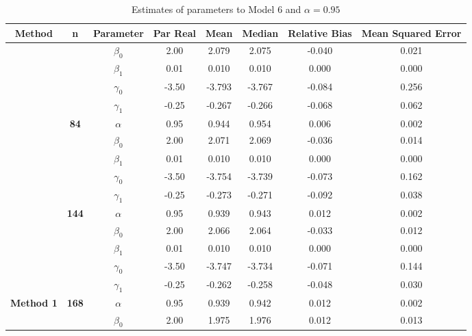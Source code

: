 \begin{table}[h]

\caption{\label{tab:Est_model_6_Alpha0.95}Estimates of parameters to Model 6 and $\alpha=0.95$}
\centering
\begin{tabular}[t]{>{}c>{}ccccccc}
\toprule
Method & n & Parameter & Par Real & Mean & Median & Relative Bias & Mean Squared Error\\
\midrule
 &  & $\beta_0$ & 2.00 & 2.079 & 2.075 & -0.040 & 0.021\\

 &  & $\beta_1$ & 0.01 & 0.010 & 0.010 & 0.000 & 0.000\\

 &  & $\gamma_0$ & -3.50 & -3.793 & -3.767 & -0.084 & 0.256\\

 &  & $\gamma_1$ & -0.25 & -0.267 & -0.266 & -0.068 & 0.062\\

 & \multirow{-5}{*}{\centering\arraybackslash \textbf{84}} & $\alpha$ & 0.95 & 0.944 & 0.954 & 0.006 & 0.002\\

 &  & $\beta_0$ & 2.00 & 2.071 & 2.069 & -0.036 & 0.014\\

 &  & $\beta_1$ & 0.01 & 0.010 & 0.010 & 0.000 & 0.000\\

 &  & $\gamma_0$ & -3.50 & -3.754 & -3.739 & -0.073 & 0.162\\

 &  & $\gamma_1$ & -0.25 & -0.273 & -0.271 & -0.092 & 0.038\\

 & \multirow{-5}{*}{\centering\arraybackslash \textbf{144}} & $\alpha$ & 0.95 & 0.939 & 0.943 & 0.012 & 0.002\\

 &  & $\beta_0$ & 2.00 & 2.066 & 2.064 & -0.033 & 0.012\\

 &  & $\beta_1$ & 0.01 & 0.010 & 0.010 & 0.000 & 0.000\\

 &  & $\gamma_0$ & -3.50 & -3.747 & -3.734 & -0.071 & 0.144\\

 &  & $\gamma_1$ & -0.25 & -0.262 & -0.258 & -0.048 & 0.030\\

\multirow{-15}{*}{\centering\arraybackslash \textbf{Method 1}} & \multirow{-5}{*}{\centering\arraybackslash \textbf{168}} & $\alpha$ & 0.95 & 0.939 & 0.942 & 0.012 & 0.002\\
\cmidrule{1-8}
 &  & $\beta_0$ & 2.00 & 1.975 & 1.976 & 0.012 & 0.013\\


\end{tabular}
\end{table}
